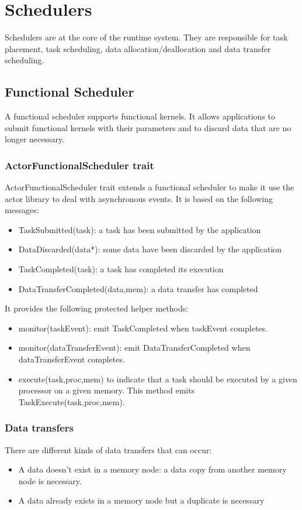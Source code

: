 \chapter{Schedulers}

Schedulers are at the core of the runtime system.
They are responsible for task placement, task scheduling, data allocation/deallocation and data transfer scheduling.

\section{Functional Scheduler}
A functional scheduler supports functional kernels.
It allows applications to submit functional kernels with their parameters and to discard data that are no longer necessary.

\subsection{ActorFunctionalScheduler trait}
ActorFunctionalScheduler trait extends a functional scheduler to make it use the actor library to deal with asynchronous events.
It is based on the following messages:
\begin{itemize}
  \item TaskSubmitted(task): a task has been submitted by the application
  \item DataDiscarded(data*): some data have been discarded by the application
  \item TaskCompleted(task): a task has completed its execution
  \item DataTransferCompleted(data,mem): a data transfer has completed
\end{itemize}

It provides the following protected helper methods:
\begin{itemize}
  \item monitor(taskEvent): emit TaskCompleted when taskEvent completes.
  \item monitor(dataTransferEvent): emit DataTransferCompleted when dataTransferEvent completes.
  \item execute(task,proc,mem) to indicate that a task should be executed by a given processor on a given memory. This method emits TaskExecute(task,proc,mem).
\end{itemize}

\subsection{Data transfers}
There are different kinds of data transfers that can occur:
\begin{itemize}
  \item A data doesn't exist in a memory node: a data copy from another memory node is necessary.
  \item A data already exists in a memory node but a duplicate is necessary 
\end{itemize}

